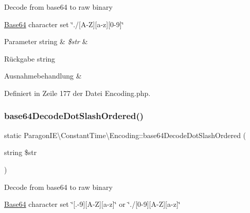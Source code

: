 Decode from base64 to raw binary

\mbox{\hyperlink{class_paragon_i_e_1_1_constant_time_1_1_base64}{Base64}} character set \char`\"{}./\mbox{[}\+A-\/\+Z\mbox{]}\mbox{[}a-\/z\mbox{]}\mbox{[}0-\/9\mbox{]}\char`\"{}


\begin{DoxyParams}[1]{Parameter}
string & {\em \$str} & \\
\hline
\end{DoxyParams}
\begin{DoxyReturn}{Rückgabe}
string 
\end{DoxyReturn}

\begin{DoxyExceptions}{Ausnahmebehandlung}
{\em } & \\
\hline
\end{DoxyExceptions}


Definiert in Zeile 177 der Datei Encoding.\+php.

\mbox{\label{class_paragon_i_e_1_1_constant_time_1_1_encoding_af7d9eaa932d09feb5ff379e9bf233c92}} 
\subsubsection{\texorpdfstring{base64\+Decode\+Dot\+Slash\+Ordered()}{base64DecodeDotSlashOrdered()}}
{\footnotesize\ttfamily static Paragon\+I\+E\textbackslash{}\+Constant\+Time\textbackslash{}\+Encoding\+::base64\+Decode\+Dot\+Slash\+Ordered (\begin{DoxyParamCaption}\item[{string}]{\$str }\end{DoxyParamCaption})\hspace{0.3cm}{\ttfamily [static]}}

Decode from base64 to raw binary

\mbox{\hyperlink{class_paragon_i_e_1_1_constant_time_1_1_base64}{Base64}} character set \char`\"{}\mbox{[}.-\/9\mbox{]}\mbox{[}\+A-\/\+Z\mbox{]}\mbox{[}a-\/z\mbox{]}\char`\"{} or \char`\"{}./\mbox{[}0-\/9\mbox{]}\mbox{[}\+A-\/\+Z\mbox{]}\mbox{[}a-\/z\mbox{]}\char`\"{}


